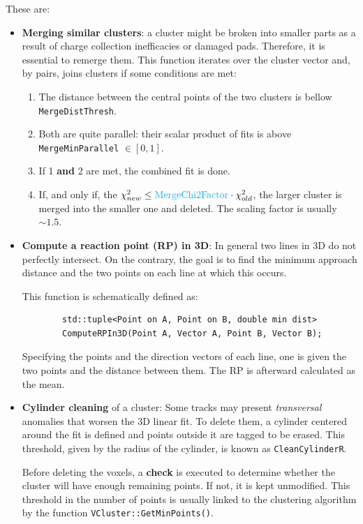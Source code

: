 \documentclass[11pt, a4paper, english]{article}
\begin{document}
These are:
\begin{itemize}
	\item \textbf{Merging similar clusters}: a cluster might be broken into smaller parts as a result of charge collection inefficacies or damaged pads. Therefore, it is essential to remerge them. This function iterates over the cluster vector and, by pairs, joins clusters if some conditions are met:
	      \begin{enumerate}
		      \item The distance between the central points of the two clusters is bellow \lstinline|MergeDistThresh|.
		      \item Both are quite parallel: their scalar product of fits is above \lstinline|MergeMinParallel| $\in [0, 1]$.
		      \item If 1 \textbf{and} 2 are met, the combined fit is done.
		      \item If, and only if, the $\chi^2_{new} \leq \textcolor{ProcessBlue}{\text{MergeChi2Factor}} \cdot \chi^2_{old}$, the larger cluster is merged into the smaller one and deleted. The scaling factor is usually $\sim \num{1.5}$.
	      \end{enumerate}
	\item \textbf{Compute a reaction point (RP) in 3D}: In general two lines in 3D do not perfectly intersect. On the contrary, the goal is to find the minimum approach distance and the two points on each line at which this occurs. 
	
	This function is schematically defined as:
	\begin{lstlisting}
		std::tuple<Point on A, Point on B, double min dist> 
		ComputeRPIn3D(Point A, Vector A, Point B, Vector B);
	\end{lstlisting}
	Specifying the points and the direction vectors of each line, one is given the two points and the distance between them. The RP is afterward calculated as the mean.
	\item \textbf{Cylinder cleaning} of a cluster: Some tracks may present \textit{transversal} anomalies that worsen the 3D linear fit. To delete them, a cylinder centered around the fit is defined and points outside it are tagged to be erased. This threshold, given by the radius of the cylinder, is known as \lstinline|CleanCylinderR|.
	
	Before deleting the voxels, a \textbf{check} is executed to determine whether the cluster will have enough remaining points. If not, it is kept unmodified. This threshold in the number of points is usually linked to the clustering algorithm by the function \lstinline|VCluster::GetMinPoints()|.


\end{itemize}
\end{document}
